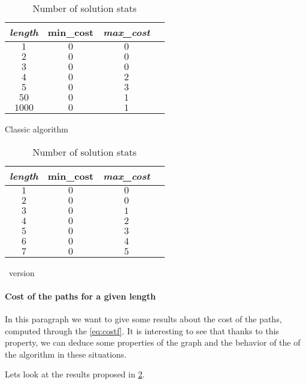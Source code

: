 \begin{table}
  \centering
  \begin{subtable}{.47\linewidth}
    \centering
    \begin{tabular}{cccc}
      \textit{length} & min\_cost & \textit{max\_cost} \\
      \hline
      $1$             & $0$       & $0$                \\
      $2$             & $0$       & $0$                \\
      $3$             & $0$       & $0$                \\
      $4$             & $0$       & $2$                \\
      $5$             & $0$       & $3$                \\
      $50$            & $0$       & $1$                \\
      $1000$          & $0$       & $1$                \\
    \end{tabular}
    \caption{Classic algorithm}
  \end{subtable}
  \quad
  \begin{subtable}{.47\linewidth}
    \centering
    \begin{tabular}{cccc}
      \textit{length} & min\_cost & \textit{max\_cost} \\
      \hline
      $1$             & $0$       & $0$                \\
      $2$             & $0$       & $0$                \\
      $3$             & $0$       & $1$                \\
      $4$             & $0$       & $2$                \\
      $5$             & $0$       & $3$                \\
      $6$             & $0$       & $4$                \\
      $7$             & $0$       & $5$                \\
    \end{tabular}
    \caption{\alldiff\ version}
  \end{subtable}

  \caption[short]{Number of solution stats}
  \label{tbl:sol_stats}
\end{table}

\paragraph{Cost of the paths for a given length}

In this paragraph we want to give some results about the cost of the paths, computed through the \cref{eq:costf}. It is interesting to see that thanks to this property, we can deduce some properties of the graph and the behavior of the of the algorithm in these situations.

Lets look at the results proposed in \cref{tbl:sol_stats}.